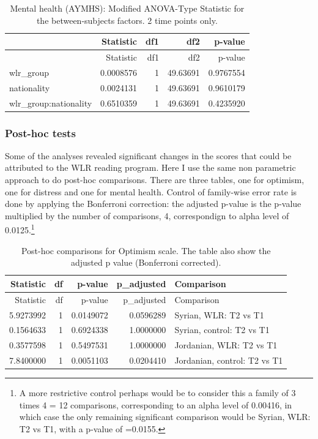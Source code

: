 \documentclass[]{article}
\begin{document}
\begin{longtable}[]{@{}lrrrr@{}}
\caption{Mental health (AYMHS): Modified ANOVA-Type Statistic for the
between-subjects factors. 2 time points only.}\tabularnewline
\toprule
& Statistic & df1 & df2 & p-value\tabularnewline
\midrule
\endfirsthead
\toprule
& Statistic & df1 & df2 & p-value\tabularnewline
\midrule
\endhead
wlr\_group & 0.0008576 & 1 & 49.63691 & 0.9767554\tabularnewline
nationality & 0.0024131 & 1 & 49.63691 & 0.9610179\tabularnewline
wlr\_group:nationality & 0.6510359 & 1 & 49.63691 &
0.4235920\tabularnewline
\bottomrule
\end{longtable}

\newpage

\hypertarget{post-hoc-tests}{%
\subsubsection{Post-hoc tests}\label{post-hoc-tests}}

Some of the analyses revealed significant changes in the scores that
could be attributed to the WLR reading program. Here I use the same non
parametric approach to do post-hoc comparisons. There are three tables,
one for optimism, one for distress and one for mental health. Control of
family-wise error rate is done by applying the Bonferroni correction:
the adjusted p-value is the p-value multiplied by the number of
comparisons, 4, correspondign to alpha level of 0.0125.\footnote{A more
  restrictive control perhaps would be to consider this a family of 3
  times 4 = 12 comparisons, corresponding to an alpha level of 0.00416,
  in which case the only remaining significant comparison would be
  Syrian, WLR: T2 vs T1, with a p-value of =0.0155.}

\begin{longtable}[]{@{}rrrrl@{}}
\caption{Post-hoc comparisons for Optimism scale. The table also show
the adjusted p value (Bonferroni corrected).}\tabularnewline
\toprule
Statistic & df & p-value & p\_adjusted & Comparison\tabularnewline
\midrule
\endfirsthead
\toprule
Statistic & df & p-value & p\_adjusted & Comparison\tabularnewline
\midrule
\endhead
5.9273992 & 1 & 0.0149072 & 0.0596289 & Syrian, WLR: T2 vs
T1\tabularnewline
0.1564633 & 1 & 0.6924338 & 1.0000000 & Syrian, control: T2 vs
T1\tabularnewline
0.3577598 & 1 & 0.5497531 & 1.0000000 & Jordanian, WLR: T2 vs
T1\tabularnewline
7.8400000 & 1 & 0.0051103 & 0.0204410 & Jordanian, control: T2 vs
T1\tabularnewline
\bottomrule
\end{longtable}
\end{document}
